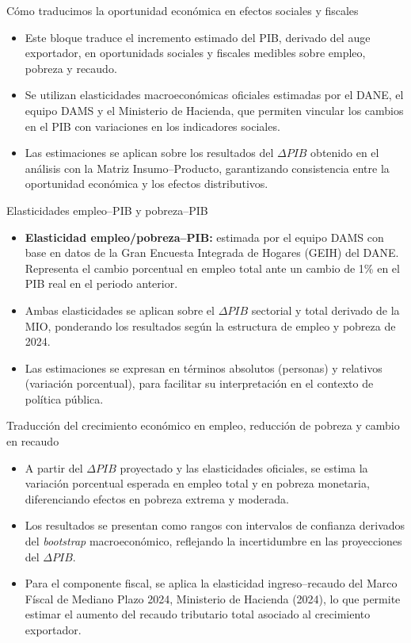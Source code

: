 \documentclass[aspectratio=169,xcolor=dvipsnames]{beamer}
\begin{document}
\begin{frame}{Cómo traducimos la oportunidad económica en efectos sociales y fiscales}
    \begin{itemize}
        \item Este bloque traduce el incremento estimado del PIB, derivado del auge exportador, en oportunidads sociales y fiscales medibles sobre empleo, pobreza y recaudo.
        \item Se utilizan elasticidades macroeconómicas oficiales estimadas por el DANE, el equipo DAMS y el Ministerio de Hacienda, que permiten vincular los cambios en el PIB con variaciones en los indicadores sociales.
        \item Las estimaciones se aplican sobre los resultados del \(\Delta PIB\) obtenido en el análisis con la Matriz Insumo–Producto, garantizando consistencia entre la oportunidad económica y los efectos distributivos.
    \end{itemize}
\end{frame}

\begin{frame}{Elasticidades empleo–PIB y pobreza–PIB}
    \begin{itemize}
        \item \textbf{Elasticidad empleo/pobreza–PIB:} estimada por el equipo DAMS con base en datos de la Gran Encuesta Integrada de Hogares (GEIH) del DANE. Representa el cambio porcentual en empleo total ante un cambio de 1\% en el PIB real en el periodo anterior.
        \item Ambas elasticidades se aplican sobre el \(\Delta PIB\) sectorial y total derivado de la MIO, ponderando los resultados según la estructura de empleo y pobreza de 2024.
        \item Las estimaciones se expresan en términos absolutos (personas) y relativos (variación porcentual), para facilitar su interpretación en el contexto de política pública.
    \end{itemize}
\end{frame}

\begin{frame}{Traducción del crecimiento económico en empleo, reducción de pobreza y cambio en recaudo}
    \begin{itemize}
        \item A partir del \(\Delta PIB\) proyectado y las elasticidades oficiales, se estima la variación porcentual esperada en empleo total y en pobreza monetaria, diferenciando efectos en pobreza extrema y moderada.
        \item Los resultados se presentan como rangos con intervalos de confianza derivados del \textit{bootstrap} macroeconómico, reflejando la incertidumbre en las proyecciones del \(\Delta PIB\).
        \item Para el componente fiscal, se aplica la elasticidad ingreso–recaudo del Marco Físcal de Mediano Plazo 2024, Ministerio de Hacienda (2024), lo que permite estimar el aumento del recaudo tributario total asociado al crecimiento exportador.
    \end{itemize}
\end{frame}
\end{document}
